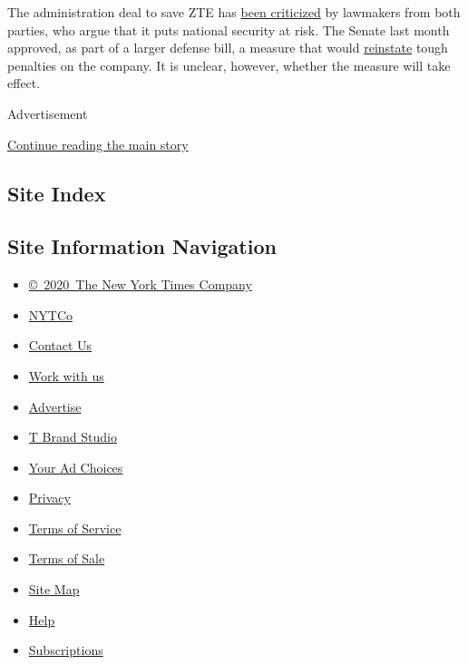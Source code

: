 The administration deal to save ZTE has
\href{https://www.nytimes.com/2018/06/18/us/politics/senate-zte-trump.html}{been
criticized} by lawmakers from both parties, who argue that it puts
national security at risk. The Senate last month approved, as part of a
larger defense bill, a measure that would
\href{https://www.nytimes.com/2018/06/18/us/politics/senate-zte-trump.html}{reinstate}
tough penalties on the company. It is unclear, however, whether the
measure will take effect.

Advertisement

\protect\hyperlink{after-bottom}{Continue reading the main story}

\hypertarget{site-index}{%
\subsection{Site Index}\label{site-index}}

\hypertarget{site-information-navigation}{%
\subsection{Site Information
Navigation}\label{site-information-navigation}}

\begin{itemize}
\tightlist
\item
  \href{https://help.nytimes.com/hc/en-us/articles/115014792127-Copyright-notice}{©~2020~The
  New York Times Company}
\end{itemize}

\begin{itemize}
\tightlist
\item
  \href{https://www.nytco.com/}{NYTCo}
\item
  \href{https://help.nytimes.com/hc/en-us/articles/115015385887-Contact-Us}{Contact
  Us}
\item
  \href{https://www.nytco.com/careers/}{Work with us}
\item
  \href{https://nytmediakit.com/}{Advertise}
\item
  \href{http://www.tbrandstudio.com/}{T Brand Studio}
\item
  \href{https://www.nytimes.com/privacy/cookie-policy\#how-do-i-manage-trackers}{Your
  Ad Choices}
\item
  \href{https://www.nytimes.com/privacy}{Privacy}
\item
  \href{https://help.nytimes.com/hc/en-us/articles/115014893428-Terms-of-service}{Terms
  of Service}
\item
  \href{https://help.nytimes.com/hc/en-us/articles/115014893968-Terms-of-sale}{Terms
  of Sale}
\item
  \href{https://spiderbites.nytimes.com}{Site Map}
\item
  \href{https://help.nytimes.com/hc/en-us}{Help}
\item
  \href{https://www.nytimes.com/subscription?campaignId=37WXW}{Subscriptions}
\end{itemize}
